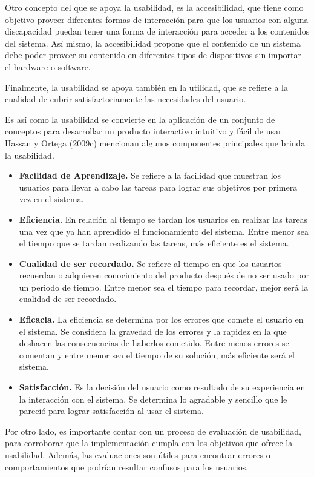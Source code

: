 Otro concepto del que se apoya la usabilidad, es la accesibilidad, que tiene como objetivo proveer diferentes formas de interacción para que los usuarios con alguna discapacidad puedan tener una forma de interacción para acceder a los contenidos del sistema. Así mismo, la accesibilidad propone que el contenido de un sistema debe poder proveer su contenido en diferentes tipos de dispositivos sin importar el hardware o software.

Finalmente, la usabilidad se apoya también en la utilidad, que se refiere a la cualidad de cubrir satisfactoriamente las necesidades del usuario.

Es así como la usabilidad se convierte en la aplicación de un conjunto de conceptos para desarrollar un producto interactivo intuitivo y fácil de usar. Hassan y Ortega (2009c) mencionan algunos componentes principales que brinda la usabilidad.

\begin{itemize}
  \item \textbf{Facilidad de Aprendizaje.} Se refiere a la facilidad que muestran los usuarios para llevar a cabo las tareas para lograr sus objetivos por primera vez en el sistema.
  \item \textbf{Eficiencia.} En relación al tiempo se tardan los usuarios en realizar las tareas una vez que ya han aprendido el funcionamiento del sistema. Entre menor sea el tiempo que se tardan realizando las tareas, más eficiente es el sistema.
  \item \textbf{Cualidad de ser recordado.} Se refiere al tiempo en que los usuarios recuerdan o adquieren conocimiento del producto después de no ser usado por un periodo de tiempo. Entre menor sea el tiempo para recordar, mejor será la cualidad de ser recordado.
  \item \textbf{Eficacia.} La eficiencia se determina por los errores que comete el usuario en el sistema. Se considera la gravedad de los errores y la rapidez en la que deshacen las consecuencias de haberlos cometido. Entre menos errores se comentan y entre menor sea el tiempo de su solución, más eficiente será el sistema.
  \item \textbf{Satisfacción.} Es la decisión del usuario como resultado de su experiencia en la interacción con el sistema. Se determina lo agradable y sencillo que le pareció para lograr satisfacción al usar el sistema.
\end{itemize}

Por otro lado, es importante contar con un proceso de evaluación de usabilidad, para corroborar que la implementación cumpla con los objetivos que ofrece la usabilidad. Además, las evaluaciones son útiles para encontrar errores o comportamientos que podrían resultar confusos para los usuarios.


